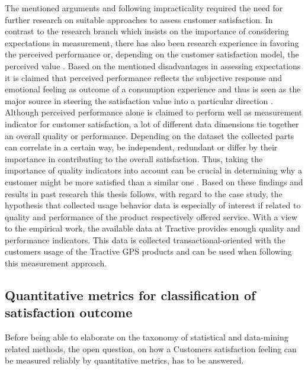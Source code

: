 The mentioned arguments and following impracticality required the need for further research on suitable approaches to assess customer satisfaction. In contrast to the research branch which insists on the importance of considering expectations in measurement, there has also been research experience in favoring the perceived performance or, depending on the customer satisfaction model, the perceived value \cite{yuksel1998customer}. Based on the mentioned disadvantages in assessing expectations it is claimed that perceived performance reflects the subjective response and emotional feeling as outcome of a consumption experience and thus is seen as the major source in steering the satisfaction value into a particular direction \cite{halstead1994multisource} \cite{cronin1992measuring}. Although perceived performance alone is claimed to perform well as measurement indicator for customer satisfaction, a lot of different data dimensions tie together an overall quality or performance. Depending on the dataset the collected parts can correlate in a certain way, be independent, redundant or differ by their importance in contributing to the overall satisfaction. Thus, taking the importance of quality indicators into account can be crucial in determining why a customer might be more satisfied than a similar one \cite{barsky1992customer}. Based on these findings and results in past research this thesis follows, with regard to the case study, the hypothesis that collected usage behavior data is especially of interest if related to quality and performance of the product respectively offered service. With a view to the empirical work, the available data at Tractive provides enough quality and performance indicators. This data is collected transactional-oriented with the customers usage of the Tractive GPS products and can be used when following this measurement approach. 

\subsection{Quantitative metrics for classification of satisfaction outcome}
\label{ssec:quantitativeMetrics}
Before being able to elaborate on the taxonomy of statistical and data-mining related methods, the open question, on how a Customers satisfaction feeling can be measured reliably by quantitative metrics, has to be answered. 

